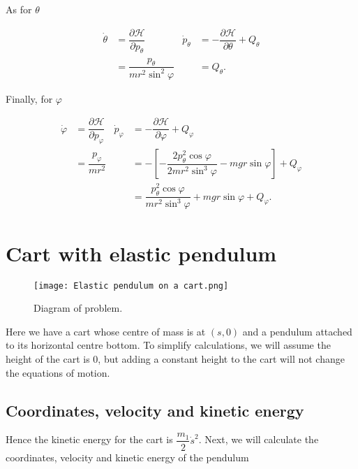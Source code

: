 \documentclass[12pt,a4paper,portrait]{article}
\newcommand{\ham}{\mathcal{H}}
\begin{document}
\begin{landscape}
As for $\theta$

\begin{align*}
	\dot{\theta} &= \dfrac{\partial \ham}{\partial p_{\theta}} & \dot{p}_{\theta} &= -\dfrac{\partial \ham}{\partial \theta} + Q_{\theta}\\
	&= \dfrac{p_{\theta}}{mr^2\sin^2{\varphi}} & &= Q_{\theta}. 
\end{align*}

Finally, for $\varphi$

\begin{align*}
	\dot{\varphi} &= \dfrac{\partial \ham}{\partial p_{\varphi}} & \dot{p}_{\varphi} &= -\dfrac{\partial \ham}{\partial \varphi} + Q_{\varphi}\\
	&= \dfrac{p_{\varphi}}{mr^2} & &=-\left[ -\dfrac{2p_{\theta}^2\cos{\varphi}}{2mr^2\sin^3{\varphi}} - mgr\sin{\varphi}\right] + Q_{\varphi} \\
	& & &= \dfrac{p_{\theta}^2\cos{\varphi}}{mr^2\sin^3{\varphi}} + mgr\sin{\varphi} + Q_{\varphi}.
\end{align*}
\end{landscape}
\section{Cart with elastic pendulum}
\begin{figure}[H]
	\texttt{[image: Elastic pendulum on a cart.png]}
	\caption{Diagram of problem.}\label{fig1}
\end{figure}

Here we have a cart whose centre of mass is at $(s, 0)$ and a pendulum attached to its horizontal centre bottom. To simplify calculations, we will assume the height of the cart is 0, but adding a constant height to the cart will not change the equations of motion.

\subsection{Coordinates, velocity and kinetic energy}
Hence the kinetic energy for the cart is $\dfrac{m_1}{2}\dot{s}^2$. Next, we will calculate the coordinates, velocity and kinetic energy of the pendulum
\end{document}
